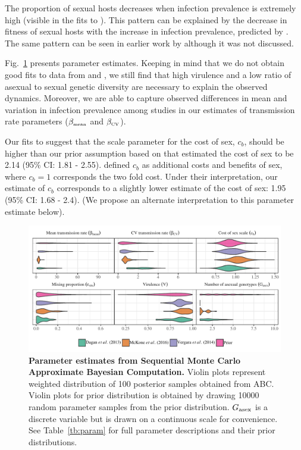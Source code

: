 \documentclass{article}\usepackage[]{graphicx}\usepackage[]{color}
\newcommand{\fref}[1]{Fig.~\ref{fig:#1}}
\begin{document}
The proportion of sexual hosts decreases when infection prevalence is extremely high (visible in the fits to \cite{vergara2014infection}).
This pattern can be explained by the decrease in fitness of sexual hosts with the increase in infection prevalence, predicted by \cite{ashby2015diversity}. 
The same pattern can be seen in earlier work by \cite{lively2010epidemiological} although it was not discussed.

\fref{smcparam} presents parameter estimates.
Keeping in mind that we do not obtain good fits to data from \cite{dagan2013clonal} and \cite{mckone2016fine}, we still find that high virulence and a low ratio of asexual to sexual genetic diversity are necessary to explain the observed dynamics.
Moreover, we are able to capture observed differences in mean and variation in infection prevalence among studies in our estimates of transmission rate parameters ($\beta_{\textrm{\tiny mean}}$ and $\beta_{\textrm{\tiny CV}}$).

Our fits to \cite{mckone2016fine} suggest that the scale parameter for the cost of sex, $c_b$, should be higher than our prior assumption based on \cite{gibson2017two} that estimated the cost of sex to be 2.14 (95\% CI: 1.81 - 2.55).
\cite{ashby2015diversity} defined $c_b$ as additional costs and benefits of sex, where $c_b=1$ corresponds the two fold cost.
Under their interpretation, our estimate of $c_b$ corresponds to a slightly lower estimate of the cost of sex: 1.95 (95\% CI: 1.68 - 2.4). 
(We propose an alternate interpretation to this parameter estimate below).

\begin{figure}[!ht]
\includegraphics[width=\textwidth]{../fig/posterior.pdf}
\caption{{\bf Parameter estimates from Sequential Monte Carlo Approximate Bayesian Computation.}
Violin plots represent weighted distribution of 100 posterior samples obtained from ABC.
Violin plots for prior distribution is obtained by drawing 10000 random parameter samples from the prior distribution.
$G_{\tiny \textrm{asex}}$ is a discrete variable but is drawn on a continuous scale for convenience.
See Table~\ref{tb:param} for full parameter descriptions and their prior distributions.
}
\label{fig:smcparam}
\end{figure}
\end{document}

